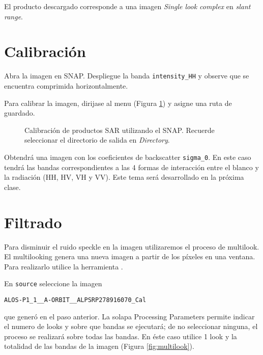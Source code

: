 El producto descargado corresponde a una imagen \emph{Single look complex} en \emph{slant range}.

\section{Calibración}

Abra la imagen  en SNAP. Despliegue la banda \texttt{intensity\_HH} y observe que se encuentra comprimida horizontalmente.

Para calibrar la imagen, dirijase al menu  (Figura \ref{fig:calibrar}) y asigne una ruta de guardado.

 \begin{figure}[h!]
     \centering
     \hspace{1cm}
     \caption{Calibración de productos SAR utilizando el SNAP. Recuerde seleccionar el directorio de salida en \emph{Directory}.} %
     \label{fig:calibrar}
 \end{figure}

 Obtendrá una imagen con los coeficientes de backscatter \texttt{sigma\_0}. En este caso tendrá las bandas correspondientes a las 4 formas de interacción entre el blanco y la radiación (HH, HV, VH y VV). Este tema será desarrollado en la próxima clase.

 \section{Filtrado}

 Para disminuir el ruido speckle en la imagen utilizaremos el proceso de multilook. El multilooking genera una nueva imagen a partir de los píxeles en una ventana. Para realizarlo utilice la herramienta .

 En \texttt{source} seleccione la imagen
 \begin{center} \texttt{ALOS-P1\_1\_\_A-ORBIT\_\_ALPSRP278916070\_Cal} \end{center}
 que generó en el paso anterior. La solapa Processing Parameters permite indicar el numero de looks y sobre que bandas se ejecutará; de no seleccionar ninguna, el proceso se realizará sobre todas las bandas. En éste caso utilice 1 look y la totalidad de las bandas de la imagen (Figura \ref{fig:multilook}).

